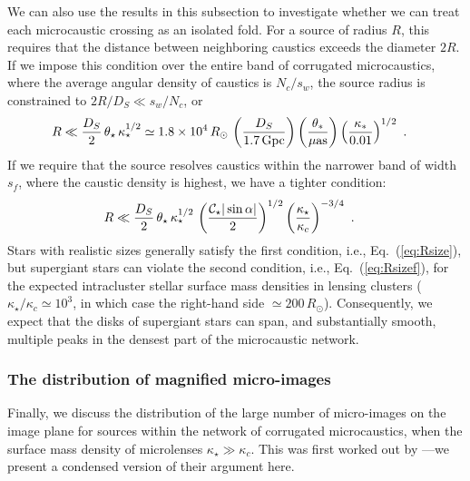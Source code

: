 \documentclass{aastex6}
\newcommand{\refeq}[1]{Eq.~(\ref{eq:#1})}
\begin{document}
We can also use the results in this subsection to investigate whether we can treat each microcaustic crossing as an isolated fold. For a source of radius $R$, this requires that the distance between neighboring caustics exceeds the diameter $2R$. If we impose this condition over the entire band of corrugated microcaustics, where the average angular density of caustics is $N_c/s_w$, the source radius is constrained to $2R/D_S \ll s_w/N_c$, or
\begin{align}
\label{eq:Rsize}
  R & \ll {D_S\over 2}\, \theta_\star\, \kappa_\star^{1/2} \simeq
 1.8 \times 10^4\, R_\odot\, \left( \frac{D_S}{1.7\,{\rm Gpc}} \right)
 \left( \frac{\theta_*}{\mu{\rm as}} \right)
 \left( \frac{\kappa_*}{0.01} \right)^{1/2} ~.
\end{align}
If we require that the source resolves caustics within the narrower band of width $s_f$, where the caustic density is highest, we have a tighter condition:
\begin{align}
\label{eq:Rsizef}
  R & \ll {D_S\over 2}\, \theta_\star\, \kappa_\star^{1/2} \, 
 \left( {\mathcal{C}_{\star} | \sin\alpha | \over 2} \right)^{1/2}
 \left( \kappa_\star \over \kappa_c \right)^{-3/4} ~.
\end{align}
Stars with realistic sizes generally satisfy the first condition, i.e., \refeq{Rsize}, but supergiant stars can violate the second condition, i.e., \refeq{Rsizef}, for the expected intracluster stellar surface mass densities in lensing clusters ($\kappa_\star/\kappa_c \simeq 10^3$, in which case the right-hand side $\simeq 200 \, R_\odot$). Consequently, we expect that the disks of supergiant stars can span, and substantially smooth, multiple peaks in the densest part of the microcaustic network.

\subsubsection{The distribution of magnified micro-images}
\label{sec:magc}

Finally, we discuss the distribution of the large number of micro-images on the image plane for sources within the network of corrugated microcaustics, when the surface mass density of microlenses $\kappa_\star \gg \kappa_c$. This was first worked out by \cite{1986ApJ...306....2K}---we present a condensed version of their argument here. 
\end{document}
